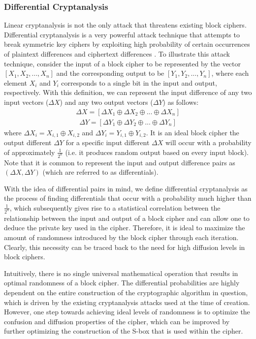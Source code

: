 \documentclass[11pt]{article}
\begin{document}
\subsubsection{Differential Cryptanalysis}
Linear cryptanalysis is not the only attack that threatens existing block ciphers. Differential cryptanalysis is a very powerful attack technique that attempts to break symmetric key ciphers by exploiting high probability of certain occurrences of plaintext differences and ciphertext differences \cite{Heys01atutorial}. To illustrate this attack technique, consider the input of a block cipher to be represented by the vector $[X_1, X_2,..., X_n]$ and the corresponding output to be $[Y_1, Y_2, ..., Y_n]$, where each element $X_i$ and $Y_i$ corresponds to a single bit in the input and output, respectively. With this definition, we can represent the input difference of any two input vectors ($\Delta X$) and any two output vectors ($\Delta Y$) as follows:
\begin{eqnarray*}
\Delta X = [\Delta X_1 \oplus \Delta X_2 \oplus ... \oplus \Delta X_n]
\end{eqnarray*}
\begin{eqnarray*}
\Delta Y= [\Delta Y_1 \oplus \Delta Y_2 \oplus ... \oplus \Delta Y_n]
\end{eqnarray*}
where $\Delta X_i = X_{i,1} \oplus X_{i,2}$ and $\Delta Y_i = Y_{i,1} \oplus Y_{i,2}$. It is an ideal block cipher the output different $\Delta Y$ for a specific input different $\Delta X$ will occur with a probability of approximately $\frac{1}{2^n}$ (i.e. it produces random output based on every input block). Note that it is common to represent the input and output difference pairs as $(\Delta X, \Delta Y)$ (which are referred to as differentials).

With the idea of differential pairs in mind, we define differential cryptanalysis as the process of finding differentials that occur with a probability much higher than $\frac{1}{2^n}$, which subsequently gives rise to a statistical correlation between the relationship between the input and output of a block cipher and can allow one to deduce the private key used in the cipher. Therefore, it is ideal to maximize the amount of randomness introduced by the block cipher through each iteration. Clearly, this necessity can be traced back to the need for high diffusion levels in block ciphers.

Intuitively, there is no single universal mathematical operation that results in optimal randomness of a block cipher. The differential probabilities are highly dependent on the entire construction of the cryptographic algorithm in question, which is driven by the existing cryptanalysis attacks used at the time of creation. However, one step towards achieving ideal levels of randomness is to optimize the confusion and diffusion properties of the cipher, which can be improved by further optimizing the construction of the S-box that is used within the cipher.
\end{document}
